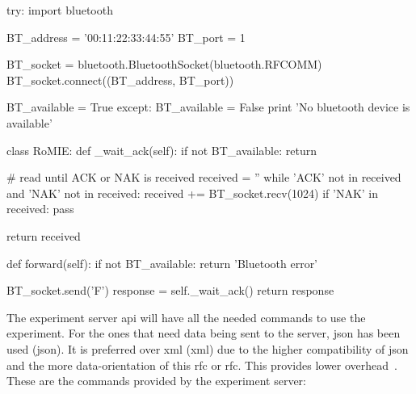 \begin{center}
\begin{minipage}{.9\textwidth}
\singlespace
{}
\begin{pyglist}[language=python, caption={\acrlong{bt} connection example.},
	label={alg:rasp_bluetooth}, listingname={Algorithm}, numbers=left]
try:
    import bluetooth

    BT_address = '00:11:22:33:44:55'
    BT_port = 1

    BT_socket = bluetooth.BluetoothSocket(bluetooth.RFCOMM)
    BT_socket.connect((BT_address, BT_port))

    BT_available = True
except:
    BT_available = False
    print 'No bluetooth device is available'

class RoMIE:
    def _wait_ack(self):
        if not BT_available: return

        # read until ACK or NAK is received
        received = ''
        while 'ACK' not in received and 'NAK' not in received:
            received += BT_socket.recv(1024)
        if 'NAK' in received:
            pass

        return received

    def forward(self):
        if not BT_available: return 'Bluetooth error'

        BT_socket.send('F')
        response = self._wait_ack()
        return response
\end{pyglist}
\end{minipage}
\end{center}

The experiment server \acrshort{api} will have all the needed commands to use the experiment. For
the ones that need data being sent to the server, \acrshort{json} has been used (\acrlong{json}). It
is preferred over \acrshort{xml} (\acrlong{xml}) due to the higher compatibility of \acrshort{json}
and the more data-orientation of this \acrlong{rfc} or \acrshort{rfc}. This provides lower
overhead~\cite{xml_vs_json}. These are the commands provided by the experiment server:

